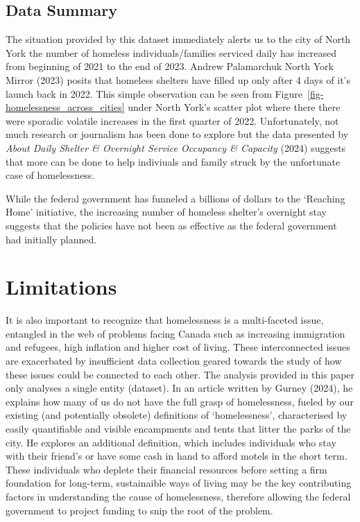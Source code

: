 \documentclass[
  letterpaper,
  DIV=11,
  numbers=noendperiod]{scrartcl}
\begin{document}
\subsection{Data Summary}\label{data-summary}

The situation provided by this dataset immediately alerts us to the city
of North York the number of homeless individuals/families serviced daily
has increased from beginning of 2021 to the end of 2023. Andrew
Palamarchuk North York Mirror (2023) posits that homeless shelters have
filled up only after 4 days of it's launch back in 2022. This simple
observation can be seen from Figure~\ref{fig-homelessness_across_cities}
under North York's scatter plot where there there were sporadic volatile
increases in the first quarter of 2022. Unfortunately, not much research
or journalism has been done to explore but the data presented by
\emph{About Daily Shelter \& Overnight Service Occupancy \& Capacity}
(2024) suggests that more can be done to help indiviuals and family
struck by the unfortunate case of homelessness.

While the federal government has funneled a billions of dollars to the
`Reaching Home' initiative, the increasing number of homeless shelter's
overnight stay suggests that the policies have not been as effective as
the federal government had initially planned.

\section{Limitations}\label{limitations}

It is also important to recognize that homelessness is a multi-faceted
issue, entangled in the web of problems facing Canada such as increasing
immigration and refugees, high inflation and higher cost of living.
These interconnected issues are exacerbated by insufficient data
collection geared towards the study of how these issues could be
connected to each other. The analysis provided in this paper only
analyses a single entity (dataset). In an article written by Gurney
(2024), he explains how many of us do not have the full grasp of
homelessness, fueled by our existing (and potentially obsolete)
definitions of `homelessness', characterised by easily quantifiable and
visible encampments and tents that litter the parks of the city. He
explores an additional definition, which includes individuals who stay
with their friend's or have some cash in hand to afford motels in the
short term. These individuals who deplete their financial resources
before setting a firm foundation for long-term, sustainaible ways of
living may be the key contributing factors in understanding the cause of
homelessness, therefore allowing the federal government to project
funding to snip the root of the problem.
\end{document}
